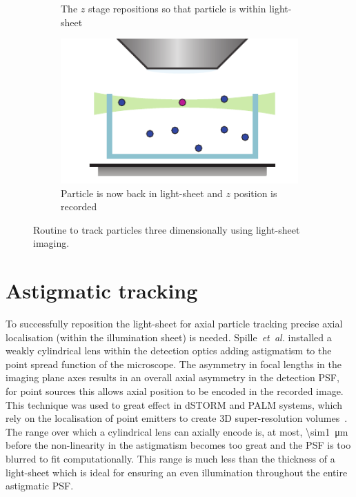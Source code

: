 \begin{figure}
\begin{subfigure}[t]{0.45\linewidth}
		\caption{The \(z\) stage repositions so that particle is within light-sheet}\label{fig:SPIMSPT3}
	\end{subfigure}\quad
	\begin{subfigure}[t]{0.45\linewidth}
		\centering
		\includegraphics{Chapters/spt/Figs/PDF/tracking/4_piezo_track}
		\caption{Particle is now back in light-sheet and \(z\) position is recorded}\label{fig:SPIMSPT4}
	\end{subfigure}
	\caption{Routine to track particles three dimensionally using light-sheet imaging.}\label{fig:SPIMSPT}
\end{figure}

\section{Astigmatic tracking}

To successfully reposition the light-sheet for axial particle tracking %
precise axial localisation (within the illumination sheet) is needed.
Spille~\emph{et~al.} installed a weakly cylindrical lens within the detection optics adding astigmatism to the point spread function of the microscope.
The asymmetry in focal lengths
in the imaging plane axes %
results in an overall axial asymmetry in the detection \gls{PSF}, for point sources this allows axial position to be encoded in the recorded image.
This technique was used to great effect in \gls{dSTORM} and PALM systems, which rely on the localisation of point emitters to create \gls{3D} \gls{super-resolution} volumes~\cite{huangThreeDimensionalSuperResolutionImaging2008}.
The range over which a cylindrical lens can axially encode is, at most, \SI{\sim1}{\micro\metre} before the non-linearity in the astigmatism becomes too great and the \gls{PSF} is too blurred to fit computationally.
This range is much less than the thickness of a light-sheet which is ideal for ensuring an even illumination throughout the entire astigmatic \gls{PSF}.

